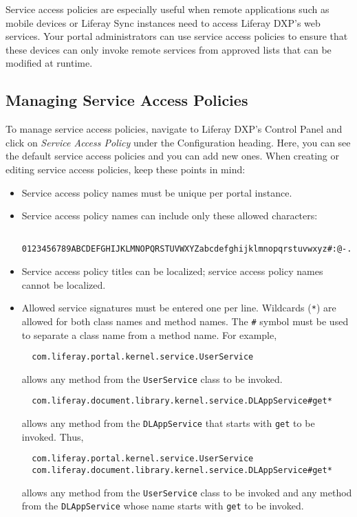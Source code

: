 Service access policies are especially useful when remote applications
such as mobile devices or Liferay Sync instances need to access Liferay
DXP's web services. Your portal administrators can use service access
policies to ensure that these devices can only invoke remote services
from approved lists that can be modified at runtime.

\subsection{Managing Service Access
Policies}\label{managing-service-access-policies}

To manage service access policies, navigate to Liferay DXP's Control
Panel and click on \emph{Service Access Policy} under the Configuration
heading. Here, you can see the default service access policies and you
can add new ones. When creating or editing service access policies, keep
these points in mind:

\begin{itemize}
\item
  Service access policy names must be unique per portal instance.
\item
  Service access policy names can include only these allowed characters:

\begin{verbatim}
  0123456789ABCDEFGHIJKLMNOPQRSTUVWXYZabcdefghijklmnopqrstuvwxyz#:@-./_
\end{verbatim}
\item
  Service access policy titles can be localized; service access policy
  names cannot be localized.
\item
  Allowed service signatures must be entered one per line. Wildcards
  (\texttt{*}) are allowed for both class names and method names. The
  \texttt{\#} symbol must be used to separate a class name from a method
  name. For example,

\begin{verbatim}
  com.liferay.portal.kernel.service.UserService
\end{verbatim}

  allows any method from the \texttt{UserService} class to be invoked.

\begin{verbatim}
  com.liferay.document.library.kernel.service.DLAppService#get*
\end{verbatim}

  allows any method from the \texttt{DLAppService} that starts with
  \texttt{get} to be invoked. Thus,

\begin{verbatim}
  com.liferay.portal.kernel.service.UserService
  com.liferay.document.library.kernel.service.DLAppService#get*
\end{verbatim}

  allows any method from the \texttt{UserService} class to be invoked
  and any method from the \texttt{DLAppService} whose name starts with
  \texttt{get} to be invoked.
\end{itemize}

